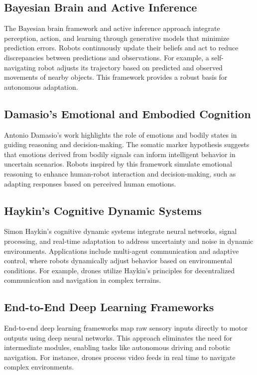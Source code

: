         
    \subsection{Bayesian Brain and Active Inference}
    The Bayesian brain framework and active inference approach integrate perception, action, and learning through generative models that minimize prediction errors. Robots continuously update their beliefs and act to reduce discrepancies between predictions and observations. For example, a self-navigating robot adjusts its trajectory based on predicted and observed movements of nearby objects. This framework provides a robust basis for autonomous adaptation. \cite{friston-2010-free-energy}
    
    \subsection{Damasio’s Emotional and Embodied Cognition}
    Antonio Damasio's work highlights the role of emotions and bodily states in guiding reasoning and decision-making. The somatic marker hypothesis suggests that emotions derived from bodily signals can inform intelligent behavior in uncertain scenarios. Robots inspired by this framework simulate emotional reasoning to enhance human-robot interaction and decision-making, such as adapting responses based on perceived human emotions. \cite{damasio-1994-descartes-error}
    
    \subsection{Haykin’s Cognitive Dynamic Systems}
    Simon Haykin’s cognitive dynamic systems integrate neural networks, signal processing, and real-time adaptation to address uncertainty and noise in dynamic environments. Applications include multi-agent communication and adaptive control, where robots dynamically adjust behavior based on environmental conditions. For example, drones utilize Haykin’s principles for decentralized communication and navigation in complex terrains. \cite{haykin-2012-cognitive-dynamic-systems}
    
    \subsection{End-to-End Deep Learning Frameworks}
    End-to-end deep learning frameworks map raw sensory inputs directly to motor outputs using deep neural networks. This approach eliminates the need for intermediate modules, enabling tasks like autonomous driving and robotic navigation. For instance, drones process video feeds in real time to navigate complex environments. \cite{lecun-2015-deep-learning}
    
